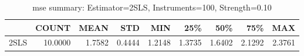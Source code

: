 \begin{table}[ht]
\centering
\caption{mse summary: Estimator=2SLS, Instruments=100, Strength=0.10}
\begin{tabular}{lrrrrrrrr}
\toprule
 & COUNT & MEAN & STD & MIN & 25\% & 50\% & 75\% & MAX \\
\midrule
2SLS & 10.0000 & 1.7582 & 0.4444 & 1.2148 & 1.3735 & 1.6402 & 2.1292 & 2.3761 \\
\bottomrule
\end{tabular}
\end{table}
